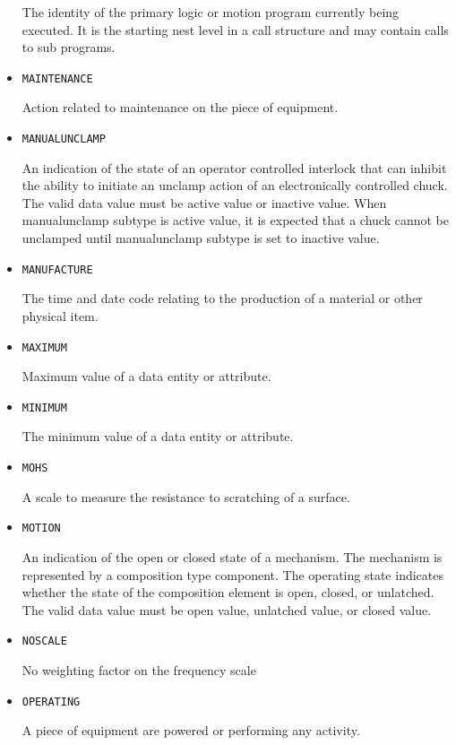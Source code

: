 \begin{itemize}
The identity of the primary logic or motion program currently being executed. It is the starting nest level in a call structure and may contain calls to sub programs.


\item \texttt{MAINTENANCE}  

Action related to maintenance on the piece of equipment.


\item \texttt{MANUAL\textunderscore UNCLAMP}  

An indication of the state of an operator controlled interlock that can inhibit the ability to initiate an unclamp action of an electronically controlled chuck.
 The valid data value must be active value or inactive value. 
 When manualunclamp subtype is active value, it is expected that a chuck cannot be unclamped until manualunclamp subtype is set to inactive value. 


\item \texttt{MANUFACTURE}  

The time and date code relating to the production of a material or other physical item.


\item \texttt{MAXIMUM}  

Maximum value of a data entity or attribute.


\item \texttt{MINIMUM}  

The minimum value of a data entity or attribute.


\item \texttt{MOHS}  

A scale to measure the resistance to scratching of a surface.


\item \texttt{MOTION}  

An indication of the open or closed state of a mechanism.   The mechanism is represented by a composition type component. 
 The operating state indicates whether the state of the composition element is open, closed, or unlatched.   
 The valid data value must be open value, unlatched value, or closed value.


\item \texttt{NO\textunderscore SCALE}  

No weighting factor on the frequency scale


\item \texttt{OPERATING}  

A piece of equipment are powered or performing any activity.



\end{itemize}
